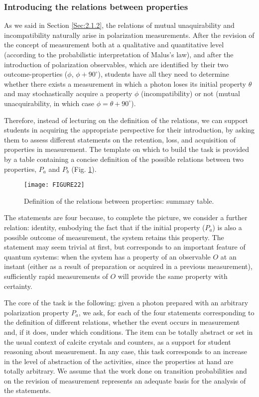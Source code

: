 \documentclass[twocolumn,secnumarabic,amssymb, nobibnotes, aps, prd, nofootinbib]{revtex4-2}
\begin{document}
\subsubsection{Introducing the relations between properties} \label{Sec:3.3.1}
As we said in Section \ref{Sec:2.1.2}, the relations of mutual unaquirability and incompatibility naturally arise in polarization measurements. After the revision of the concept of measurement both at a qualitative and quantitative level (according to the probabilistic interpretation of Malus's law), and after the introduction of polarization observables, which are identified by their two outcome-properties ($\phi$, $\phi+90^{\circ}$), students have all they need to determine whether there exists a measurement in which a photon loses its initial property $\theta$ and may stochastically acquire a property $\phi$ (incompatibility) or not (mutual unacquirability, in which case $\phi=\theta+90^{\circ}$).

Therefore, instead of lecturing on the definition of the relations, we can support students in acquiring the appropriate perspective for their introduction, by asking them to assess different statements on the retention, loss, and acquisition of properties in measurement. The template on which to build the task is provided by a table containing a concise definition of the possible relations between two properties, $P_a$ and $P_b$ (Fig. \ref{FIG:22}).
\begin{figure}[!htpb]
       \texttt{[image: FIGURE22]}
    \caption{Definition of the relations between properties: summary table.}
    \label{FIG:22}
\end{figure}
The statements are four because, to complete the picture, we consider a further relation: identity, embodying the fact that if the initial property ($P_a$) is also a possible outcome of measurement, the system retains this property. The statement may seem trivial at first, but corresponds to an important feature of quantum systems: when the system has a property of an observable $O$ at an instant (either as a result of preparation or acquired in a previous measurement), sufficiently rapid measurements of $O$ will provide the same property with certainty.

The core of the task is the following: given a photon prepared with an arbitrary polarization property $P_a$, we ask, for each of the four statements corresponding to the definition of different relations, whether the event occurs in measurement and, if it does, under which conditions. The item can be totally abstract or set in the usual context of calcite crystals and counters, as a support for student reasoning about measurement. In any case, this task corresponds to an increase in the level of abstraction of the activities, since the properties at hand are totally arbitrary. We assume that the work done on transition probabilities and on the revision of measurement represents an adequate basis for the analysis of the statements.
\end{document}
